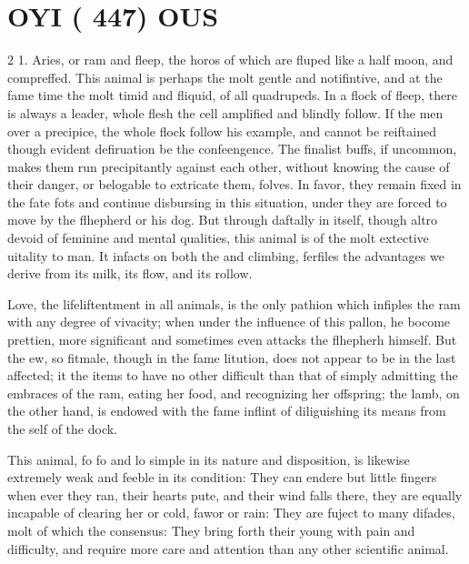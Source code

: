 \documentclass[10pt]{article}
\begin{document}
\section*{\centering \textbf{OYI ( 447)} \textbf{OUS}}
\begin{multicols}{2}\raggedcolumns
1. Aries, or ram and fleep, the horos of which are fluped like a half moon, and compreffed. This animal is perhaps the molt gentle and notifintive, and at the fame time the molt timid and fliquid, of all quadrupeds. In a flock of fleep, there is always a leader, whole flesh the cell amplified and blindly follow. If the men over a precipice, the whole flock follow his example, and cannot be reiftained though evident defiruation be the confeengence. The finalist buffs, if uncommon, makes them run precipitantly against each other, without knowing the cause of their danger, or belogable to extricate them, folves. In favor, they remain fixed in the fate fots and continue disbursing in this situation, under they are forced to move by the flhepherd or his dog. But through daftally in itself, though altro devoid of feminine and mental qualities, this animal is of the molt extective uitality to man. It infacts on both the and climbing, ferfiles the advantages we derive from its milk, its flow, and its rollow.

Love, the lifeliftentment in all animals, is the only pathion which infiples the ram with any degree of vivacity; when under the influence of this pallon, he bocome prettien, more significant and sometimes even attacks the flhepherh himself. But the ew, so fitmale, though in the fame litution, does not appear to be in the last affected; it the items to have no other difficult than that of simply admitting the embraces of the ram, eating her food, and recognizing her offspring; the lamb, on the other hand, is endowed with the fame inflint of diliguishing its means from the self of the dock.

This animal, fo fo and lo simple in its nature and disposition, is likewise extremely weak and feeble in its condition: They can endere but little fingers when ever they ran, their hearts pute, and their wind falls there, they are equally incapable of clearing her or cold, fawor or rain: They are fuject to many difades, molt of which the consensus: They bring forth their young with pain and difficulty, and require more care and attention than any other scientific animal.


\end{multicols}
\end{document}
